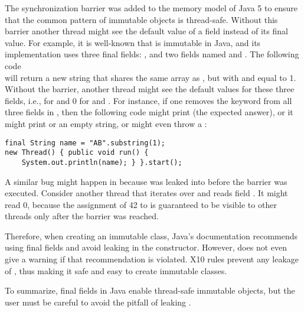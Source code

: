 The synchronization barrier was added to the memory model of Java 5
    to ensure that the common pattern of immutable objects is thread-safe.
Without this barrier another thread might see the default value of a field
    instead of its final value.
For example, it is well-known that  is immutable in Java,
    and its implementation uses three {final} fields:
    , and two  fields named  and .
The following code
    ~~\\
will return a new string 
    that shares
    the same  array as , %
    but with  and  equal to 1.
Without the barrier, %
    another thread might see the default values for these three fields,
    i.e.,  for  and 0 for  and .
For instance,
    if one removes the  keyword from all three fields in ,
    then
    the following code might print  (the expected answer),
    or it might print
     or an empty string,
    or might even throw a :
\vspace{-0.2cm}\begin{lstlisting}
final String name = "AB".substring(1);
new Thread() { public void run() {
    System.out.println(name); } }.start();
\end{lstlisting}\vspace{-0.2cm}

A similar bug might happen in 
    because \this was leaked into  before the barrier was executed.
Consider another thread that iterates over  and reads field .
It might read 0, because the assignment of 42 to  is guaranteed to be visible to other threads
    only after the barrier was reached.

Therefore, when creating an immutable class,
    Java's documentation recommends using final fields
    and avoid leaking \this in the constructor.
However,  does not even give a warning if that recommendation is violated.
X10 rules prevent any leakage of \this,
    thus making it safe and easy to create immutable classes.

To summarize, final fields in Java
    enable thread-safe immutable objects,
    but the user must be careful to avoid the pitfall of leaking \this.

